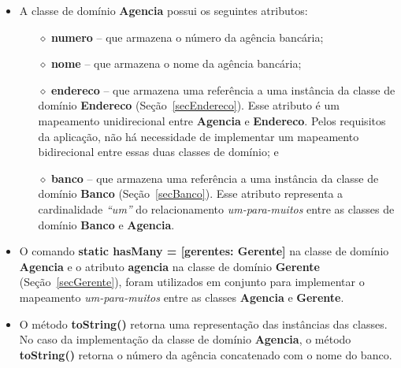 \begin{itemize}

\item A classe de domínio {\bf Agencia} possui os seguintes atributos:

\vspace{0.5cm}

\begin{itemize}

\item[$\diamond$] {\bf numero} -- que armazena o número da agência bancária; 

\vspace{0.5cm}

\item[$\diamond$] {\bf nome} -- que armazena o nome da agência bancária; 

\vspace{0.5cm}


\item[$\diamond$] {\bf endereco} -- que  armazena uma referência a uma instância
  da classe de domínio  {\bf Endereco} (Seção~\ref{secEndereco}).  Esse atributo
  é um  mapeamento unidirecional  entre {\bf Agencia}  e {\bf  Endereco}.  Pelos
  requisitos  da aplicação,  não  há necessidade  de  implementar um  mapeamento
  bidirecional entre essas duas classes de domínio; e

\vspace{0.5cm}

\item[$\diamond$] {\bf banco} -- que  armazena uma referência a uma instância da
  classe   de  domínio  {\bf   Banco}  (Seção~\ref{secBanco}).    Esse  atributo
  representa a cardinalidade {\em ``um''} do relacionamento {\em um-para-muitos}
  entre as classes de domínio {\bf Banco} e {\bf Agencia}.

\end{itemize}

\vspace{0.5cm}

\item O comando {\bf static hasMany  = [gerentes: Gerente]} na classe de domínio
  {\bf Agencia}  e o atributo {\bf  agencia} na classe de  domínio {\bf Gerente}
  (Seção~\ref{secGerente}),  foram  utilizados em  conjunto  para implementar  o
  mapeamento  {\em  um-para-muitos}  entre  as  classes  {\bf  Agencia}  e  {\bf
    Gerente}.

\vspace{0.5cm}

\item O  método {\bf  toString()} retorna uma  representação das  instâncias das
  classes.   No caso  da implementação  da classe  de domínio  {\bf  Agencia}, o
  método {\bf toString()} retorna o número  da agência concatenado com o nome do
  banco.

\end{itemize}

